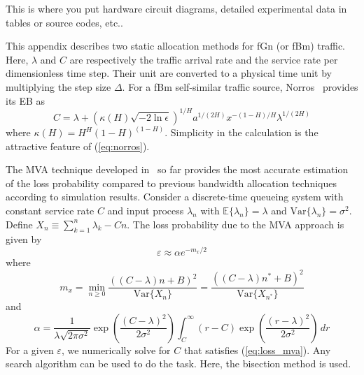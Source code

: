 \documentclass[12pt,oneside,openright,a4paper]{cpe-thai-project}
\begin{document}
This is where you put hardware circuit diagrams, detailed experimental data in tables or source codes, etc.. \\ \bigskip



This appendix describes two static allocation methods for fGn (or fBm)
traffic. Here, $\lambda$ and $C$ are respectively the traffic arrival
rate and the service rate per dimensionless time step. Their unit are
converted to a physical time unit by multiplying the step size
$\Delta$. For a fBm self-similar traffic source,
Norros~\cite{norros95} provides its EB as
\begin{equation}\label{eq:norros}
  C = \lambda + (\kappa(H)\sqrt{-2\ln\epsilon})^{1/H}a^{1/(2H)}x^{-(1-H)/H}\lambda^{1/(2H)}
\end{equation}
where $\kappa(H) = H^H(1-H)^{(1-H)}$. Simplicity in the calculation is
the attractive feature of (\ref{eq:norros}).

The MVA technique developed in~\cite{kim01} so far provides the most
accurate estimation of the loss probability compared to previous
bandwidth allocation techniques according to simulation results.
Consider a discrete-time queueing system with constant service rate
$C$ and input process $\lambda_n$ with $\mathbb{E}\{\lambda_n\} =
\lambda$ and $\mathrm{Var}\{\lambda_n\} = \sigma^2$.  Define $X_n \equiv
\sum_{k=1}^n \lambda_k - Cn$.  The loss probability due to the MVA
approach is given by
\begin{equation}\label{eq:loss_mva}
  \varepsilon \approx \alpha e^{-m_x/2}
\end{equation}
where
\begin{equation}\label{eq:mx}
m_x = \min_{n \geq 0} \frac{((C-\lambda)n + B)^2}{\mathrm{Var}\{X_n\}} =
\frac{((C-\lambda)n^\ast + B)^2}{\mathrm{Var}\{X_{n^{\ast}}\}}
\end{equation} 
and 
\begin{equation}\label{eq:alpha}
  \alpha =
  \frac{1}{\lambda\sqrt{2\pi\sigma^2}}\exp\left(\frac{(C-\lambda)^2}{2\sigma^2}\right)
  \int_C^\infty (r-C)\exp\left(\frac{(r-\lambda)^2}{2\sigma^2}\right)\, dr
\end{equation}
For a given $\varepsilon$, we numerically solve for $C$ that satisfies
(\ref{eq:loss_mva}). Any search algorithm can be used to do the task.
Here, the bisection method is used.  
\end{document}
